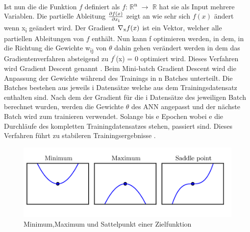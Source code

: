 \documentclass{llncs}
\begin{document}
Ist nun die die Funktion $f$ definiert als $f$: $\mathbb{R}$\textsuperscript{n} $\rightarrow$  $\mathbb{R}$ hat sie als Input mehrere Variablen. Die partielle Ableitung $\frac{\partial f(x)}{\partial x\textsubscript{i}}$ zeigt an wie sehr sich $f(x)$ ändert wenn x\textsubscript{i} geändert wird. Der Gradient $\nabla\textsubscript{x}f(x)$ ist ein Vektor, welcher alle partiellen Ableitungen von $f$ enthält. Nun kann f optimieren  werden, in dem, in die Richtung die Gewichte w\textsubscript{ij} von $\theta$ dahin gehen verändert werden in dem das Gradientenverfahren absteigend zu $f^\prime$(x) = 0 optimiert wird. Dieses Verfahren wird Gradient Descent genannt \cite{Grundlagen}. Beim Mini-batch Gradient Descent wird die Anpassung der Gewichte während des Trainings in n Batches unterteilt. Die Batches bestehen aus jeweils i Datensätze welche aus dem Trainingsdatensatz enthalten sind. Nach dem der Gradient für die i Datensätze des jeweiligen Batch berechnet wurden, werden die Gewichte $\theta$ des ANN angepasst und der nächste Batch wird zum trainieren verwendet. Solange bis e Epochen wobei e die Durchläufe des kompletten Trainingdatensatzes stehen, passiert sind. Dieses Verfahren führt zu stabileren Trainingsergebnisse \cite{batchgradeint}.

\begin{figure}[htbp] 
	\centering
	\includegraphics[width=1.0\textwidth]{saddle.png}
	\caption{Minimum,Maximum und Sattelpunkt einer Zielfunktion\protect\cite{saddleimage}}
	\label{fig:Bild5}
\end{figure}
\end{document}
